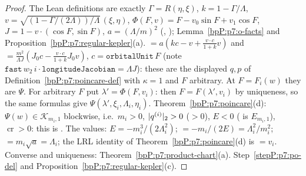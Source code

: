 \begin{proof}
\label{stepP:p7:d25-ab} The Lean definitions are exactly $\Gamma=R(\eta,\xi)$, $k=1-\Gamma/\Lambda$, $v=\sqrt{(1-\Gamma/(2\Lambda))/\Lambda}\,(\xi,\eta)$, $\Phi(F,v)=F-v_0\sin F+v_1\cos F$, $J=1-v\cdot(\cos F,\sin F)$, $a=(\Lambda/m)^2$ (, ); Lemma~\ref{bpP:p7:o-facts} and Proposition~\ref{bpP:p7:regular-kepler}(a).
\label{stepP:p7:d25-c} ${}=a(kc-v+\frac{v\cdot c}{1+k}v)$ and ${}=\frac{m^2}{\Lambda J}(J_0c-\frac{v\cdot c}{1+k}J_0v)$, $c=\texttt{orbitalUnit}\,F$ (note $\texttt{fast}\,w_2\,i\cdot\texttt{longitudeJacobian}=\Lambda J$): these are the displayed $q,p$ of Definition~\ref{bpP:p7:poincare-def} with $\kappa=1$ and $F$ arbitrary. At $F=F_i(w)$ they are $\Psi$. For arbitrary $F$ put $\lambda'=\Phi(F,v_i)$: then $F=F(\lambda',v_i)$ by uniqueness, so the same formulas give $\Psi(\lambda',\xi_i,\Lambda_i,\eta_i)$.
\label{stepP:p7:d25-d} Theorem~\ref{bpP:p7:poincare}(d): $\Psi(w)\in\mathcal K_{m_i,1}$ blockwise, i.e.\ $m_i>0$, $\lvert q^{(i)}\rvert_2>0$ ($>0$), $E<0$ ( is $E_{m_i,1}$), $\operatorname{cr}>0$: this is . The values: $E=-m_i^3/(2\Lambda_i^2)$; ${}=-m_i/(2E)=\Lambda_i^2/m_i^2$; ${}=m_i\sqrt{a}=\Lambda_i$; the LRL identity of Theorem~\ref{bpP:p7:poincare}(d) is ${}=v_i$. Converse and uniqueness: Theorem~\ref{bpP:p7:product-chart}(a).
\label{stepP:p7:d25-e} Step~\ref{stepP:p7:po-del} and Proposition~\ref{bpP:p7:regular-kepler}(c).
\end{proof}

